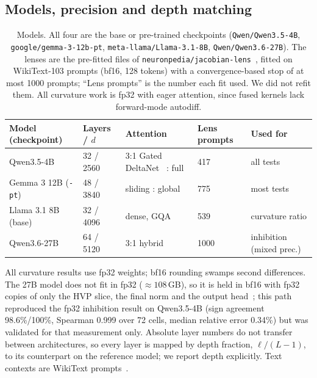 \documentclass[10pt]{article}
\begin{document}
\subsection{Models, precision and depth matching}
\begin{table}[!t]
\centering\small
\begin{tabular}{@{}p{3.0cm}p{1.9cm}p{3.3cm}p{1.6cm}p{2.6cm}@{}}
\toprule
Model (checkpoint) & Layers / $d$ & Attention & Lens prompts & Used for \\
\midrule
Qwen3.5-4B~\citep{qwen2026models} & 32 / 2560 & 3:1 Gated DeltaNet~\citep{yang2025gated} : full & 417 & all tests \\
Gemma 3 12B (\texttt{-pt})~\citep{gemmateam2025gemma3} & 48 / 3840 & sliding : global & 775 & most tests \\
Llama 3.1 8B (base)~\citep{llamateam2024llama3} & 32 / 4096 & dense, GQA & 539 & curvature ratio \\
Qwen3.6-27B~\citep{qwen2026models} & 64 / 5120 & 3:1 hybrid & 1000 & inhibition (mixed prec.) \\
\bottomrule
\end{tabular}
\caption{Models. All four are the base or pre-trained checkpoints (\texttt{Qwen/Qwen3.5-4B}, \texttt{google/gemma-3-12b-pt}, \texttt{meta-llama/Llama-3.1-8B}, \texttt{Qwen/Qwen3.6-27B}). The lenses are the pre-fitted files of \texttt{neuronpedia/jacobian-lens}~\citep{neuronpedia2026lenses}, fitted on WikiText-103 prompts (bf16, 128 tokens) with a convergence-based stop of at most 1000 prompts; ``Lens prompts'' is the number each fit used. We did not refit them. All curvature work is fp32 with eager attention, since fused kernels lack forward-mode autodiff.}
\label{tab:models}
\end{table}
All curvature results use fp32 weights; bf16 rounding swamps second differences. The 27B model does not fit in fp32 ($\approx108$\,GB), so it is held in bf16 with fp32 copies of only the HVP slice, the final norm and the output head~\citep{micikevicius2018mixed}; this path reproduced the fp32 inhibition result on Qwen3.5-4B (sign agreement 98.6\%/100\%, Spearman 0.999 over 72 cells, median relative error 0.34\%) but was validated for that measurement only. Absolute layer numbers do not transfer between architectures, so every layer is mapped by depth fraction, $\ell/(L{-}1)$, to its counterpart on the reference model; we report depth explicitly. Text contexts are WikiText prompts~\citep{merity2017pointer}.
\end{document}
